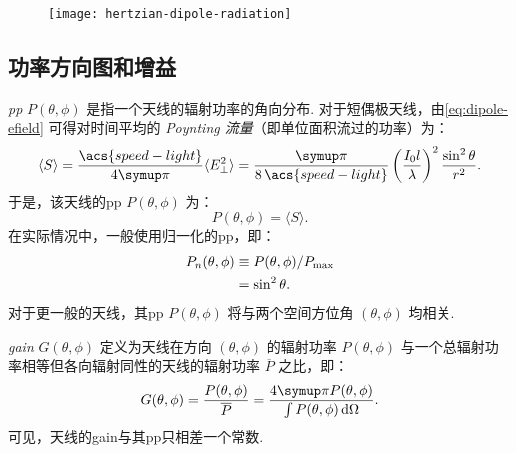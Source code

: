 \begin{figure}[htp]
  \centering
  \texttt{[image: hertzian-dipole-radiation]}
  \label{fig:dipole-radiation}
\end{figure}

\subsection{功率方向图和增益}

\emph{\acf{pp}} $P(\theta,\phi)$ 是指一个天线的辐射功率的角向分布.
对于短偶极天线，由\autoref{eq:dipole-efield} 可得对时间平均的
\emph{Poynting 流量}（即单位面积流过的功率）为：
\begin{equation}
  \label{eq:poynting-flux}
  \langle S \rangle
    = \frac{\acs{speed-light}}{4\Cpi} \langle E_{\perp}^2 \rangle
    = \frac{\Cpi}{8\,\acs{speed-light}}
      \left( \frac{I_0 l}{\lambda} \right)^2 \frac{\sin^2\theta}{r^2} .
\end{equation}
于是，该天线的\ac{pp} $P(\theta,\phi)$ 为：
\begin{equation}
  P(\theta,\phi) = \langle S \rangle.
\end{equation}
在实际情况中，一般使用归一化的\ac{pp}，即：
\begin{align}
  \label{eq:power-pattern}
  P_n(\theta,\phi)
    & \equiv P(\theta,\phi) / P_{\mathrm{max}} \\
    & = \sin^2\theta .
\end{align}
对于更一般的天线，其\ac{pp} $P(\theta,\phi)$
将与两个空间方位角 $(\theta, \phi)$ 均相关.

\emph{\acf{gain}} $G(\theta,\phi)$ 定义为天线在方向 $(\theta, \phi)$
的辐射功率 $P(\theta,\phi)$ 与一个总辐射功率相等但各向辐射同性的天线的辐射功率
$\overline{P}$ 之比，即：
\begin{equation}
  \label{eq:gain}
  G(\theta,\phi) = \frac{P(\theta,\phi)}{\overline{P}}
    = \frac{4\Cpi P(\theta,\phi)}{\int P(\theta,\phi) \,\D{\Omega}} .
\end{equation}
可见，天线的\ac{gain}与其\ac{pp}只相差一个常数.

